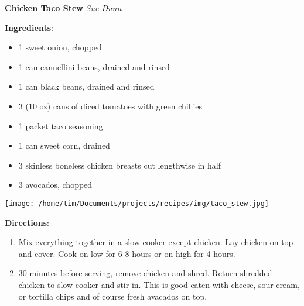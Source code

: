 \documentclass[11pt, twoside, openany]{book}
\begin{document}
\noindent\begin{minipage}[t]{\linewidth}%
{\Large\textbf{Chicken Taco Stew}} \label{chicken-taco-stew}\hfill\textit{Sue Dunn}\\
\noindent\begin{minipage}[t]{0.78\linewidth}%
\textbf{Ingredients}:\vspace{-3mm}
\begin{multicols}{2}
\begin{itemize}\setlength\itemsep{-1mm}
\item 1 sweet onion, chopped
\item 1 can cannellini beans, drained and rinsed
\item 1 can black beans, drained and rinsed
\item 3 (10 oz) cans of diced tomatoes with green chillies
\item 1 packet taco seasoning
\item 1 can sweet corn, drained
\item 3 skinless boneless chicken breasts cut lengthwise in half
\item 3 avocados, chopped
\end{itemize}
\end{multicols}
\end{minipage}
\noindent\begin{minipage}[t]{0.18\linewidth}
\centering \strut\vspace*{-\baselineskip}\newline
\texttt{[image: /home/tim/Documents/projects/recipes/img/taco\_stew.jpg]}\\
\end{minipage}\vspace{3mm}
\textbf{Directions}:
\vspace{-3mm}\begin{enumerate}\setlength\itemsep{-1mm}
\item Mix everything together in a slow cooker except chicken. Lay chicken on top and cover. Cook on low for 6-8 hours or on high for 4 hours.
\item 30 minutes before serving, remove chicken and shred. Return shredded chicken to slow cooker and stir in. This is good eaten with cheese, sour cream, or tortilla chips and of course fresh avacados on top.
\end{enumerate}
\end{minipage}\vspace{8mm}
\end{document}
